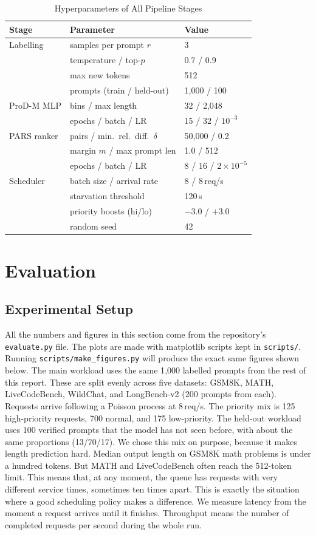 \documentclass[conference]{IEEEtran}
\begin{document}
\begin{table}[!t]
\caption{Hyperparameters of All Pipeline Stages}
\label{tab:hyperparams}
\centering
\begin{tabular}{@{}lll@{}}
\toprule
\textbf{Stage} & \textbf{Parameter} & \textbf{Value} \\
\midrule
Labelling & samples per prompt $r$ & 3 \\
 & temperature / top-$p$ & 0.7 / 0.9 \\
 & max new tokens & 512 \\
 & prompts (train / held-out) & 1{,}000 / 100 \\
\addlinespace
ProD-M MLP & bins / max length & 32 / 2{,}048 \\
 & epochs / batch / LR & 15 / 32 / $10^{-3}$ \\
\addlinespace
PARS ranker & pairs / min.\ rel.\ diff.\ $\delta$ & 50{,}000 / 0.2 \\
 & margin $m$ / max prompt len & 1.0 / 512 \\
 & epochs / batch / LR & 8 / 16 / $2\times10^{-5}$ \\
\addlinespace
Scheduler & batch size / arrival rate & 8 / 8\,req/s \\
 & starvation threshold & 120\,s \\
 & priority boosts (hi/lo) & $-3.0$ / $+3.0$ \\
 & random seed & 42 \\
\bottomrule
\end{tabular}
\end{table}

\clearpage
\section{Evaluation}
\subsection{Experimental Setup}
All the numbers and figures in this section come from the repository's \texttt{evaluate.py} file. The plots are made with matplotlib scripts kept in \texttt{scripts/}. Running \texttt{scripts/make\_figures.py} will produce the exact same figures shown below. The main workload uses the same 1{,}000 labelled prompts from the rest of this report. These are split evenly across five datasets: GSM8K, MATH, LiveCodeBench, WildChat, and LongBench-v2 (200 prompts from each). Requests arrive following a Poisson process at 8\,req/s. The priority mix is 125 high-priority requests, 700 normal, and 175 low-priority. The held-out workload uses 100 verified prompts that the model has not seen before, with about the same proportions (13/70/17). We chose this mix on purpose, because it makes length prediction hard. Median output length on GSM8K math problems is under a hundred tokens. But MATH and LiveCodeBench often reach the 512-token limit. This means that, at any moment, the queue has requests with very different service times, sometimes ten times apart. This is exactly the situation where a good scheduling policy makes a difference. We measure latency from the moment a request arrives until it finishes. Throughput means the number of completed requests per second during the whole run.
\end{document}
